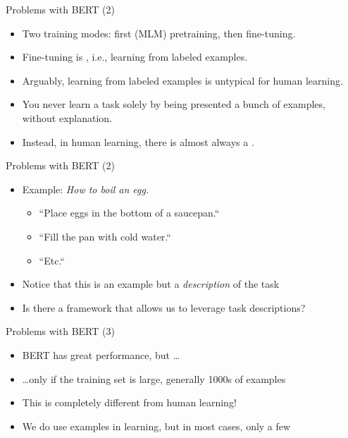\begin{frame}{Problems with BERT (2)}

\vfill
			
\begin{itemize}
\item Two training modes: first (MLM) pretraining, then fine-tuning.
\item Fine-tuning is , i.e., learning from labeled examples.
\item Arguably, learning from labeled examples is untypical for human learning.
\item You never learn a task solely by being presented a bunch of examples, without explanation.
\item Instead, in human learning, there is almost always a .
    \end{itemize}

\vfill

\end{frame}


\begin{frame}{Problems with BERT (2)}

\vfill
			
\begin{itemize}
\item Example: \textit{How to boil an egg.}
		\begin{itemize}
			\item ``Place eggs in the bottom of a saucepan.``
			\item ``Fill the pan with cold water.``
			\item ``Etc.``
		\end{itemize}
\item Notice that this is  an example but a \textit{description} of the task
\item \ques Is there a framework that allows us to leverage task descriptions?
\end{itemize}

\vfill

\end{frame}


\begin{frame}{Problems with BERT (3)}

\vfill

  \begin{itemize}
\item BERT has great performance, but \ldots
\item \ldots only if the training set is large, generally 1000s of examples
\item This is completely different from human learning!
\item We do use examples in learning, but in most cases, only a few
\end{itemize}

\vfill

\end{frame}

